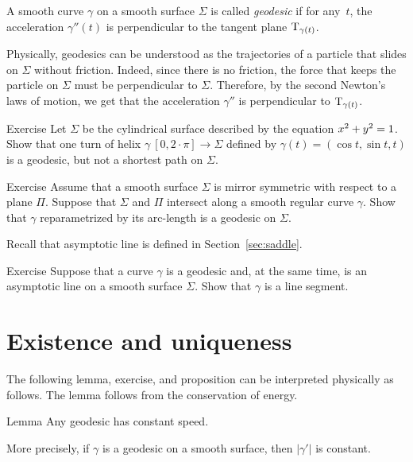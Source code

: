 A smooth curve $\gamma$ on a smooth surface $\Sigma$ is called \emph{geodesic} if for any~$t$, the acceleration $\gamma''(t)$ is perpendicular to the tangent plane $\mathrm{T}_{\gamma(t)}$.

Physically, geodesics can be understood as the trajectories of a particle that slides on $\Sigma$ without friction.
Indeed, since there is no friction, the force that keeps the particle on $\Sigma$ must be perpendicular to $\Sigma$.
Therefore, by the second Newton's laws of motion,
we get that the acceleration $\gamma''$ is perpendicular to $\mathrm{T}_{\gamma(t)}$.

\begin{thm}{Exercise}\label{ex:helix=geodesic}
Let $\Sigma$ be the cylindrical surface described by the equation $x^2\z+y^2=1$.
Show that one turn of helix $\gamma\:[0,2\cdot\pi]\to \Sigma$ defined by $\gamma(t)=(\cos t,\sin t, t)$
is a geodesic, but not a shortest path on $\Sigma$.
\end{thm}

\begin{thm}{Exercise}\label{ex:reflection-geodesic}
Assume that a smooth surface $\Sigma$ is mirror symmetric with respect to  a plane $\Pi$.
Suppose that $\Sigma$ and $\Pi$ intersect along a smooth regular curve $\gamma$.
Show that $\gamma$ reparametrized by its arc-length is a geodesic on $\Sigma$.
\end{thm}

Recall that asymptotic line is defined in Section~\ref{sec:saddle}.

\begin{thm}{Exercise}\label{ex:asymptotic-geodesic}
Suppose that a curve $\gamma$ is a geodesic and, at the same time, is an asymptotic line on a smooth surface $\Sigma$.
Show that $\gamma$ is a line segment.
\end{thm}

\section{Existence and uniqueness}

The following lemma, exercise, and proposition can be interpreted physically as follows.
The lemma follows from the conservation of energy.

\begin{thm}{Lemma}\label{lem:constant-speed}
Any geodesic has constant speed.

More precisely, if $\gamma$ is a geodesic on a smooth surface, then $|\gamma'|$ is constant.
\end{thm}

